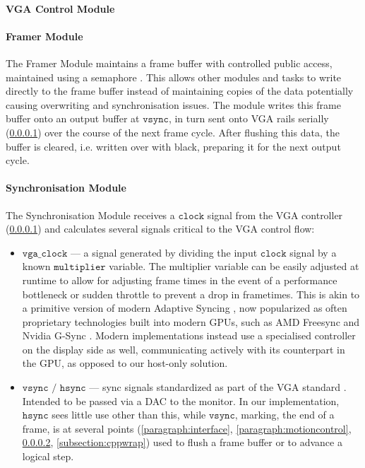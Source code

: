 \paragraph{VGA Control Module}
\label{paragraph:vgacontrol}
%
\paragraph{Framer Module}
\label{paragraph:framer}
%
The Framer Module maintains a frame buffer with controlled public access,
maintained using a semaphore \cite{semaphore}. This allows other modules and tasks 
to write directly to the frame buffer instead of maintaining copies of the data 
potentially causing overwriting and synchronisation issues. The module writes this
frame buffer onto an output buffer at \(\texttt{vsync}\), 
in turn sent onto VGA rails serially (\ref{paragraph:vgacontrol})
over the course of the next frame cycle. After flushing this data, the buffer is cleared,
i.e. written over with black, preparing it for the next output cycle.

\paragraph{Synchronisation Module}
\label{paragraph:vgasync}
%
The Synchronisation Module receives a \(\texttt{clock}\) signal from
the VGA controller (\ref{paragraph:vgacontrol}) and calculates several
signals critical to the VGA control flow:

\begin{itemize}
    \item \(\texttt{vga\_clock}\) --- a signal generated by dividing the 
            input \(\texttt{clock}\) signal by a known \(\texttt{multiplier}\)
            variable. The multiplier variable can be easily adjusted at runtime
            to allow for adjusting frame times in the event of a performance
            bottleneck or sudden throttle to prevent a drop in frametimes. This
            is akin to a primitive version of modern Adaptive Syncing \cite{varrefresh},
            now popularized as often proprietary technologies built into modern GPUs,
            such as AMD Freesync \cite{freesync} and Nvidia G-Sync \cite{gsync}. 
            Modern implementations instead use a specialised controller on the display
            side as well, communicating actively with its counterpart in the GPU,
            as opposed to our host-only solution.
    \item \(\texttt{vsync / hsync}\) --- sync signals standardized as part of the VGA
            standard \cite{vgastandard}. Intended to be passed via a DAC to the monitor.
            In our implementation, \(\texttt{hsync}\) sees little use other than this,
            while \(\texttt{vsync}\), marking, the end of a frame, is at several points 
            (\ref{paragraph:interface}, \ref{paragraph:motioncontrol}, \ref{paragraph:framer}, 
            \ref{subsection:cppwrap}) used to flush a frame buffer or to advance a logical step.
\end{itemize}


